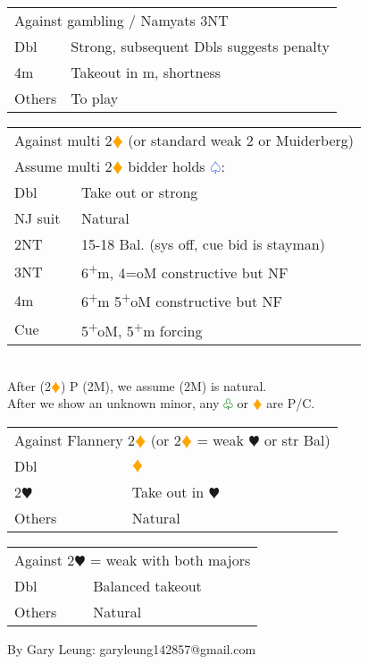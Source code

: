 \documentclass{article}
\renewcommand{\sp}{\textcolor{RoyalBlue}{$\varspade$}}
\newcommand{\he}{\textcolor{RubineRed}{$\varheart$}}
\newcommand{\di}{\textcolor{Orange}{$\vardiamond$}}
\newcommand{\cl}{\textcolor{Green}{$\varclub$}}
\newcommand{\nt}{\relsize{-1}NT\relsize{1}}
\newcommand{\up}{\textsuperscript{+}}
\begin{document}
\begin{tabular}{|l|p{6.5cm}}
	\multicolumn{2}{l}{Against gambling / Namyats 3\nt{}} \\
    Dbl & Strong, subsequent Dbls suggests penalty \\
    4m & Takeout in m, shortness \\
    Others & To play
\end{tabular}

\medskip

\begin{tabular}{|l|p{6.5cm}}
	\multicolumn{2}{l}{Against multi 2\di{} (or standard weak 2 or Muiderberg)} \\
	\multicolumn{2}{l}{Assume multi 2\di{} bidder holds \sp{}:} \\
    Dbl & Take out or strong \\
    NJ suit & Natural \\
    2\nt & 15-18 Bal. (sys off, cue bid is stayman) \\
    3\nt & 6\up{}m, 4=oM constructive but NF \\
    4m & 6\up{}m 5\up{}oM constructive but NF \\
    Cue & 5\up{}oM, 5\up{}m forcing \\
\end{tabular}\\
After (2\di{}) P (2M), we assume (2M) is natural. \\
After we show an unknown minor, any \cl{} or \di{} are P/C.

\medskip

\begin{tabular}{|l|p{6.5cm}}
	\multicolumn{2}{l}{Against Flannery 2\di{} (or 2\di{} = weak \he{} or str Bal)} \\
    Dbl & \di{} \\
    2\he{}& Take out in \he{}\\
    Others & Natural
\end{tabular}

\medskip

\begin{tabular}{|l|p{6.5cm}}
	\multicolumn{2}{l}{Against 2\he{} = weak with both majors} \\
    Dbl & Balanced takeout \\
    Others & Natural
\end{tabular}

\vfill
\hfill \footnotesize{By Gary Leung: garyleung142857@gmail.com}
\end{document}
